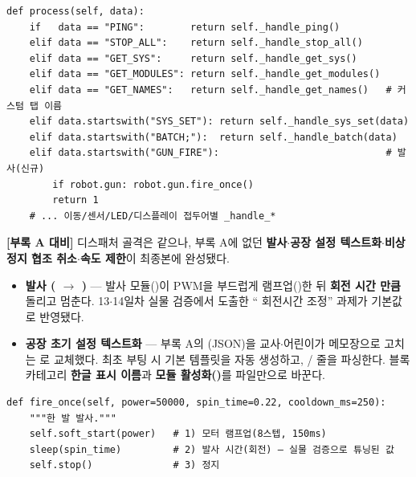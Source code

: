 \begin{verbatim}
def process(self, data):
    if   data == "PING":        return self._handle_ping()
    elif data == "STOP_ALL":    return self._handle_stop_all()
    elif data == "GET_SYS":     return self._handle_get_sys()
    elif data == "GET_MODULES": return self._handle_get_modules()
    elif data == "GET_NAMES":   return self._handle_get_names()   # 커스텀 탭 이름
    elif data.startswith("SYS_SET"): return self._handle_sys_set(data)
    elif data.startswith("BATCH;"):  return self._handle_batch(data)
    elif data.startswith("GUN_FIRE"):                             # 발사(신규)
        if robot.gun: robot.gun.fire_once()
        return 1
    # ... 이동/센서/LED/디스플레이 접두어별 _handle_*
\end{verbatim}

\smallskip
\noindent\textbf{[부록 A 대비]} 디스패처 골격은 같으나, 부록 A에 없던 \textbf{발사$\cdot$공장
설정 텍스트화$\cdot$비상정지 협조 취소$\cdot$속도 제한}이 최종본에 완성됐다.

\begin{itemize}
  \item \textbf{발사 ( $\to$ )} --- 발사 모듈()이
  PWM을 부드럽게 램프업()한 뒤 \textbf{회전 시간 만큼} 돌리고
  멈춘다. 13$\cdot$14일차 실물 검증에서 도출한 `` 회전시간 조정'' 과제가 기본값
  로 반영됐다.
  \item \textbf{공장 초기 설정 텍스트화} --- 부록 A의 (JSON)을 교사$\cdot$어린이가
  메모장으로 고치는 로 교체했다. 최초 부팅 시 기본 템플릿을
  자동 생성하고, / 줄을 파싱한다. 블록 카테고리 \textbf{한글 표시
  이름}과 \textbf{모듈 활성화()}를 파일만으로 바꾼다.
\end{itemize}

\begin{verbatim}
def fire_once(self, power=50000, spin_time=0.22, cooldown_ms=250):
    """한 발 발사."""
    self.soft_start(power)   # 1) 모터 램프업(8스텝, 150ms)
    sleep(spin_time)         # 2) 발사 시간(회전) — 실물 검증으로 튜닝된 값
    self.stop()              # 3) 정지
\end{verbatim}

